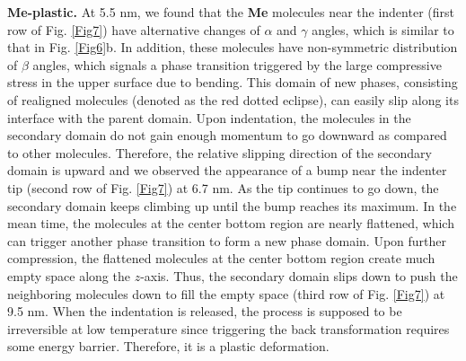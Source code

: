 \documentclass[prb,superscriptaddress,longbibliography, twocolumn]{revtex4-1}
\begin{document}
\textbf{Me-plastic.} At 5.5 nm, we found that the \textbf{Me} molecules near the indenter (first row of Fig. \ref{Fig7}) have alternative changes of $\alpha$ and $\gamma$ angles, which is similar to that in Fig. \ref{Fig6}b. In addition, these molecules have non-symmetric distribution of $\beta$ angles, which signals a phase transition triggered by the large compressive stress in the upper surface due to bending. This domain of new phases, consisting of realigned molecules (denoted as the red dotted eclipse), can easily slip along its interface with the parent domain. Upon indentation, the molecules in the secondary domain do not gain enough momentum to go downward as compared to other molecules. Therefore, the relative slipping direction of the secondary domain is upward and we observed the appearance of a bump near the indenter tip (second row of Fig. \ref{Fig7}) at 6.7 nm. As the tip continues to go down, the secondary domain keeps climbing up until the bump reaches its maximum. In the mean time, the molecules at the center bottom region are nearly flattened, which can trigger another phase transition to form a new phase domain. Upon further compression, the flattened molecules at the center bottom region create much empty space along the $z$-axis. Thus, the secondary domain slips down to push the neighboring molecules down to fill the empty space (third row of Fig. \ref{Fig7}) at 9.5 nm. When the indentation is released, the process is supposed to be irreversible at low temperature since triggering the back transformation requires some energy barrier. Therefore, it is a plastic deformation. 
\end{document}

